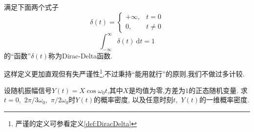 \documentclass[cn,10pt,citestyle=gb7714-2015,bibstyle=gb7714-2015]{elegantbook}
\newcommand{\md}{\ \mathrm{d}}
\begin{document}
\begin{definition}\label{def:DiracDelta-engineer}
  满足下面两个式子
  \begin{equation}
    \delta(t)=\begin{cases}
      +\infty,&t=0\\
      0,&t\neq 0
    \end{cases}
  \end{equation}
  \begin{equation}
    \int_{-\infty}^\infty\delta(t)\md t=1
  \end{equation}
  的“函数”$\delta(t)$称为Dirac-Delta函数.

  这样定义更加直观但有失严谨性\footnote{严谨的定义可参看定义\ref{def:DiracDelta}},不过秉持“能用就行”的原则,我们不做过多计较.
\end{definition}
\begin{example}
  设随机振幅信号$Y(t)=X\cos\omega_0 t$,其中$X$是均值为零,方差为$1$的正态随机变量.
  求$t=0$,\ $2\pi/3\omega_0$,\ $\pi/2\omega_0$时$Y(t)$的概率密度,
  以及任意时刻$t$,\ $Y(t)$的一维概率密度.
\end{example}
\end{document}

